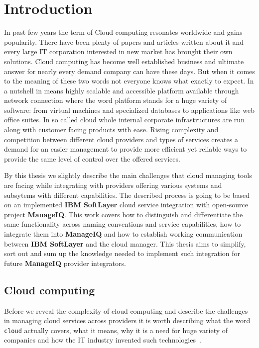
\chapter{Introduction}
\label{chap:Introduction}
In past few years the term of Cloud computing resonates worldwide and gains popularity. There have been plenty of papers and articles written about it and every large IT corporation interested in new market has brought their own solutions. Cloud computing has become well established business and ultimate answer for nearly every demand company can have these days. But when it comes to the meaning of these two words not everyone knows what exactly to expect. In a nutshell in means highly scalable and accessible platform available through network connection where the word platform stands for a huge variety of software: from virtual machines and specialized databases to applications like web office suites. In so called cloud whole internal corporate infrastructures are run along with customer facing products with ease. Rising complexity and competition between different cloud providers and types of services creates a demand for an easier management to provide more efficient yet reliable ways to provide the same level of control over the offered services.

By this thesis we slightly describe the main challenges that cloud managing tools are facing while integrating with providers offering various systems and subsytems with different capabilities. The described process is going to be based on an implemented \textbf{IBM SoftLayer} cloud service integration with open-source project \textbf{ManageIQ}. This work covers how to distinguish and differentiate the same functionality across naming conventions and service capabilities, how to integrate them into \textbf{ManageIQ} and how to establish working communication between \textbf{IBM SoftLayer} and the cloud manager. This thesis aims to simplify, sort out and sum up the knowledge needed to implement such integration for future \textbf{ManageIQ} provider integrators.

\section{Cloud computing}
\label{sec:Cloud computing}
Before we reveal the complexity of cloud computing and describe the challenges in managing cloud services across providers it is worth describing what the word \texttt{cloud} actually covers, what it means, why it is a need for huge variety of companies and how the IT industry invented such technologies~\cite{cervone}.

